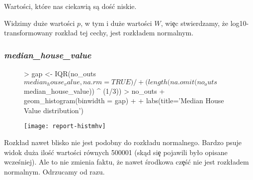 \documentclass{article}
\begin{document}
\noindent
\quad Wartości, które nas ciekawią są doś\'c niskie.

\begin{Schunk}
\end{Schunk}

\noindent
\quad Widzimy duże wartości $p$, w tym i duże wartości $W$, wi\c ec stwierdzamy, że log10-transformowany rozk\l ad tej cechy, jest rozk\l adem normalnym.

\newpage
\subsubsection{\textit{median\_house\_value}}
\begin{figure}[h!]
\centering
\begin{Schunk}
\begin{Sinput}
> gap <- IQR(no_outs$median_house_value, na.rm=TRUE) / 
+   (length(na.omit(no_outs$median_house_value)) ^ (1/3))
> no_outs %>% ggplot(aes(x=median_house_value)) + plot.properties +
+   geom_histogram(binwidth = gap) +
+   labs(title='Median House Value distribution')
\end{Sinput}
\end{Schunk}
\texttt{[image: report-histmhv]}
\end{figure}

\noindent
\quad Rozk\l ad nawet blisko nie jest podobny do rozk\l adu normalnego. Bardzo psuje widok duża iloś\'c wartości równych 500001 (skąd si\c e pojawili by\l o opisane wcześniej). Ale to nie zmienia faktu, że nawet środkowa cz\c eś\'c nie jest rozk\l adem normalnym. Odrzucamy od razu.
\end{document}
